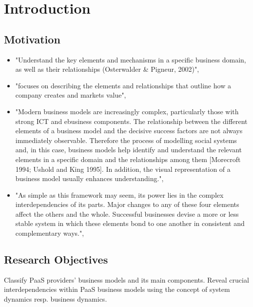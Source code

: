 \chapter{Introduction}\label{ch:intro}

\section{Motivation}

\begin{itemize}
	\item "Understand the key elements and mechanisms in a specific business domain, as well as their relationships (Osterwalder \& Pigneur, 2002)", \citep[p. 303]{Pateli2004}
	\item "focuses on describing the elements and relationships that outline how a company creates and markets value", \citep[p. 7]{Osterwalder2005}
	\item "Modern business models are increasingly complex, particularly those with strong ICT and ebusiness components. The relationship between the different elements of a business model and the decisive success factors are not always immediately observable. Therefore the process of modelling social systems and, in this case, business models help identify and understand the relevant elements in a specific domain and the relationships among them [Morecroft 1994; Ushold and King 1995]. In addition, the visual representation of a business model usually enhances understanding.", \citep[p. 14]{Osterwalder2005}
	\item "As simple as this framework may seem, its power lies in the complex interdependencies of its parts. Major changes to any of these four elements affect the others and the whole. Successful businesses devise a more or less stable system in which these elements bond to one another in consistent and complementary ways.", \citep[p. 53]{Johnson2008}
\end{itemize}


\section{Research Objectives}

Classify PaaS providers' business models and its main components. Reveal crucial interdependencies within PaaS business models using the concept of system dynamics resp. business dynamics.

